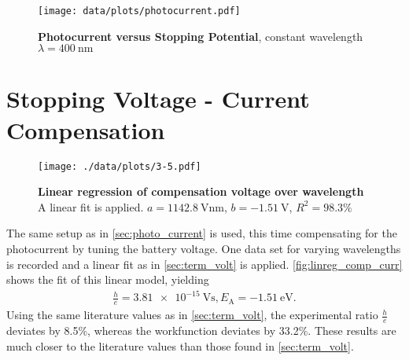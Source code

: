 \begin{figure}[tbp]
	\centering
	\texttt{[image: data/plots/photocurrent.pdf]}
	\caption[Photocurrent versus Stopping Potential]{\textbf{Photocurrent versus Stopping Potential}, constant wavelength $\lambda = \SI{400}{\nm}$}
	\label{plt:photocurrent}
\end{figure}

\section{Stopping Voltage - Current Compensation}%
\begin{figure}[tbp]
	\centering
	\texttt{[image: ./data/plots/3-5.pdf]}
	\caption[Linear regression of compensation voltage over wavelength]{\textbf{Linear regression of compensation voltage over wavelength} A linear fit is applied. $a=\SI{1142.8}{\volt\nm}$, $b=\SI{-1.51}{\V}$, $R^2=98.3\%$}
	\label{fig:linreg_comp_curr}
\end{figure}
The same setup as in \autoref{sec:photo_current} is used, this time compensating for the photocurrent by tuning the battery voltage.
One data set for varying wavelengths is recorded and a linear fit as in \autoref{sec:term_volt} is applied.
\autoref{fig:linreg_comp_curr} shows the fit of this linear model, yielding
\begin{gather*}
	\frac{h}{e}=\SI{3.81e-15}{\volt\second}, E_\text{A}=\SI{-1.51}{\eV}.
\end{gather*}
Using the same literature values as in \autoref{sec:term_volt}, the experimental ratio $\frac{h}{e}$ deviates by \num{8.5}\%, whereas the workfunction deviates by \num{33.2}\%.
These results are much closer to the literature values than those found in \autoref{sec:term_volt}.
